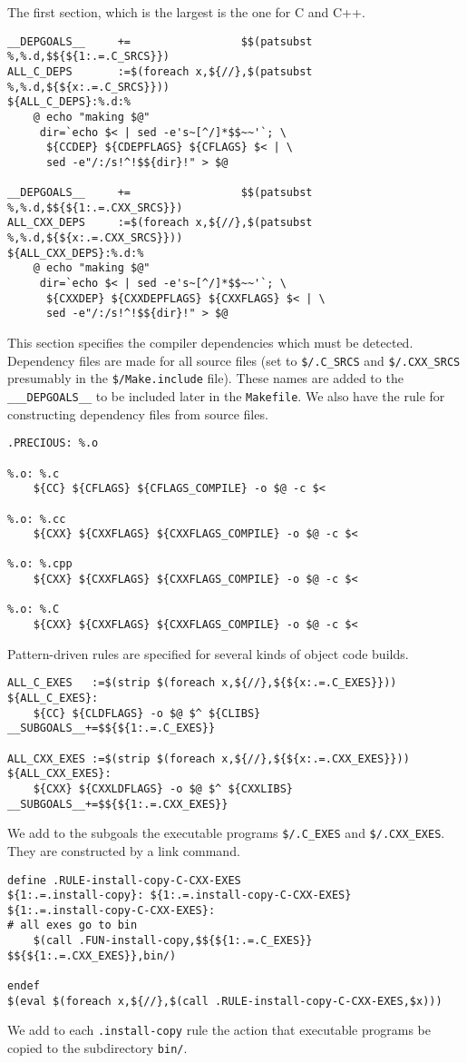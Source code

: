 \documentclass[letterpaper]{article}
\begin{document}
The first section, which is the largest is the one for C and C++.
\begin{verbatim}
__DEPGOALS__     +=                 $$(patsubst %,%.d,$${${1:.=.C_SRCS}})
ALL_C_DEPS       :=$(foreach x,${//},$(patsubst %,%.d,${${x:.=.C_SRCS}}))
${ALL_C_DEPS}:%.d:%
	@ echo "making $@"
	 dir=`echo $< | sed -e's~[^/]*$$~~'`; \
	  ${CCDEP} ${CDEPFLAGS} ${CFLAGS} $< | \
	  sed -e"/:/s!^!$${dir}!" > $@

__DEPGOALS__     +=                 $$(patsubst %,%.d,$${${1:.=.CXX_SRCS}})
ALL_CXX_DEPS     :=$(foreach x,${//},$(patsubst %,%.d,${${x:.=.CXX_SRCS}}))
${ALL_CXX_DEPS}:%.d:%
	@ echo "making $@"
	 dir=`echo $< | sed -e's~[^/]*$$~~'`; \
	  ${CXXDEP} ${CXXDEPFLAGS} ${CXXFLAGS} $< | \
	  sed -e"/:/s!^!$${dir}!" > $@
\end{verbatim}
This section specifies the compiler dependencies which must be
detected.  Dependency files are made for all source files
(set to \verb+$/.C_SRCS+ and \verb+$/.CXX_SRCS+ presumably in
the \verb+$/Make.include+ file).  These
names are added to the \verb+___DEPGOALS__+ to be included later
in the \verb+Makefile+.  We also have the rule for constructing
dependency files from source files.

\begin{verbatim}
.PRECIOUS: %.o

%.o: %.c
	${CC} ${CFLAGS} ${CFLAGS_COMPILE} -o $@ -c $<

%.o: %.cc
	${CXX} ${CXXFLAGS} ${CXXFLAGS_COMPILE} -o $@ -c $<

%.o: %.cpp
	${CXX} ${CXXFLAGS} ${CXXFLAGS_COMPILE} -o $@ -c $<

%.o: %.C
	${CXX} ${CXXFLAGS} ${CXXFLAGS_COMPILE} -o $@ -c $<
\end{verbatim}
Pattern-driven rules are specified for several kinds of
object code builds.

\begin{verbatim}
ALL_C_EXES   :=$(strip $(foreach x,${//},${${x:.=.C_EXES}}))
${ALL_C_EXES}:
	${CC} ${CLDFLAGS} -o $@ $^ ${CLIBS}
__SUBGOALS__+=$${${1:.=.C_EXES}}

ALL_CXX_EXES :=$(strip $(foreach x,${//},${${x:.=.CXX_EXES}}))
${ALL_CXX_EXES}:
	${CXX} ${CXXLDFLAGS} -o $@ $^ ${CXXLIBS}
__SUBGOALS__+=$${${1:.=.CXX_EXES}}
\end{verbatim}
We add to the subgoals the executable programs \verb+$/.C_EXES+ and
\verb+$/.CXX_EXES+.  They are constructed by a link command.

\begin{verbatim}
define .RULE-install-copy-C-CXX-EXES
${1:.=.install-copy}: ${1:.=.install-copy-C-CXX-EXES}
${1:.=.install-copy-C-CXX-EXES}:
# all exes go to bin
	$(call .FUN-install-copy,$${${1:.=.C_EXES}} $${${1:.=.CXX_EXES}},bin/)

endef
$(eval $(foreach x,${//},$(call .RULE-install-copy-C-CXX-EXES,$x)))
\end{verbatim}
We add to each \verb+.install-copy+ rule the action that executable
programs be copied to the subdirectory \verb+bin/+.
\end{document}
